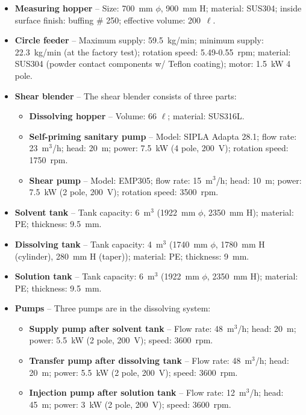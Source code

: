\documentclass[preprint,12pt]{elsarticle}
\begin{document}
\begin{itemize}
    \item{\bf Measuring hopper} -- Size: 700~mm $\phi$, 900~mm H; material:  SUS304; inside surface finish: buffing \# 250; effective volume: 200~$\ell$.
    \item {\bf Circle feeder} -- Maximum supply: 59.5~kg/min; minimum supply: 22.3~kg/min (at the factory test); rotation speed: 5.49-0.55~rpm; material: SUS304 (powder contact components w/ Teflon coating); motor: 1.5~kW 4 pole.
    \item {\bf Shear blender} -- The shear blender consists of three parts:
    \begin{itemize}
        \item{\bf Dissolving hopper} -- Volume: 66 $\ell$; material: SUS316L.
        \item{\bf Self-priming sanitary pump} -- Model: SIPLA Adapta 28.1; flow rate: 23~m$^3$/h; head: 20~m; power: 7.5~kW (4 pole, 200~V); rotation speed: 1750~rpm.
        \item{\bf Shear pump} -- Model: EMP305; flow rate: 15~m$^3$/h; head: 10~m; power: 7.5~kW (2 pole, 200~V); rotation speed: 3500~rpm.
    \end{itemize}
    \item{\bf Solvent tank} -- Tank capacity: 6~m$^3$ (1922~mm $\phi$, 2350~mm H); material: PE; thickness: 9.5~mm.
    \item{\bf Dissolving tank} -- Tank capacity: 4~m$^3$ (1740~mm $\phi$, 1780~mm H (cylinder), 280~mm H (taper)); material: PE; thickness: 9~mm.
    \item{\bf Solution tank} -- Tank capacity: 6~m$^3$ (1922~mm $\phi$, 2350~mm H); material: PE; thickness: 9.5~mm.
    \item{\bf Pumps} -- Three pumps are in the dissolving system:
    \begin{itemize}
        \item{\bf Supply pump after solvent tank} -- Flow rate: 48~m$^3$/h; head: 20~m; power: 5.5~kW (2 pole, 200~V); speed: 3600~rpm. 
        \item {\bf Transfer pump after dissolving tank} -- Flow rate: 48~m$^3$/h; head: 20~m; power: 5.5~kW (2 pole, 200~V); speed: 3600~rpm. 
        \item {\bf Injection pump after solution tank} -- Flow rate: 12~m$^3$/h; head: 45~m; power: 3~kW (2 pole, 200~V); speed: 3600~rpm. 
    \end{itemize}
\end{itemize}
\end{document}
